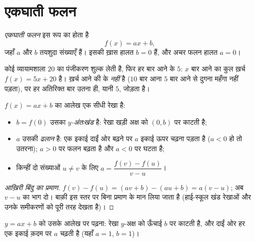 \section{एकघाती फलन}

\begin{definition}\label{def:g9:linfunc:affine}
\emph{एकघाती फलन} इस रूप का होता है
\[
f(x) = a x + b ,
\]
जहाँ $a$ और $b$ तयशुदा संख्याएँ हैं।  इसकी ख़ास हालत $b = 0$
हैं, और अचर फलन हालत $a = 0$।
\end{definition}

\begin{example}
कोई व्यायामशाला $20$ का पंजीकरण शुल्क लेती है, फिर हर बार आने के $5$:
$x$ बार आने का कुल ख़र्च $f(x) = 5x + 20$ है। ख़र्च आने की  के
\emph{ नहीं} है ($10$ बार आना $5$ बार आने से दुगना महँगा नहीं
पड़ता), पर हर अतिरिक्त बार उतना ही, यानी $5$, जोड़ता है।
\end{example}

\begin{proposition}\label{prop:g9:linfunc:affinegraph}
$f(x) = ax + b$ का आलेख एक सीधी रेखा है:
\begin{itemize}
  \item $b = f(0)$ उसका \emph{$y$-अंतःखंड} है: रेखा खड़ी अक्ष को
        $(0, b)$ पर काटती है;
  \item $a$ उसकी \emph{ढलान} है: एक इकाई दाईं ओर बढ़ने पर
        $a$ इकाई ऊपर चढ़ना पड़ता है ($a < 0$ हो तो उतरना); $a > 0$ पर
        फलन बढ़ता है और $a < 0$ पर घटता है;
  \item किन्हीं दो संख्याओं $u \neq v$ के लिए
        $a = \dfrac{f(v) - f(u)}{v - u}$।
\end{itemize}
\end{proposition}

\begin{proof}[आख़िरी बिंदु का प्रमाण]
$f(v) - f(u) = (av + b) - (au + b) = a(v - u)$; अब $v - u$ का भाग दो।
बाक़ी इस स्तर पर बिना प्रमाण के मान लिया जाता है (हाई-स्कूल खंड
रेखाओं और उनके समीकरणों को पूरी तरह देखता है)।
\end{proof}

\begin{omfigure}

{\small $y = ax + b$ को उसके आलेख पर पढ़ना: रेखा $y$-अक्ष को ऊँचाई
$b$ पर काटती है, और दाईं ओर हर एक इकाई क़दम पर $a$ चढ़ती है (यहाँ
$a = 1$, $b = 1$)।}
\end{omfigure}

